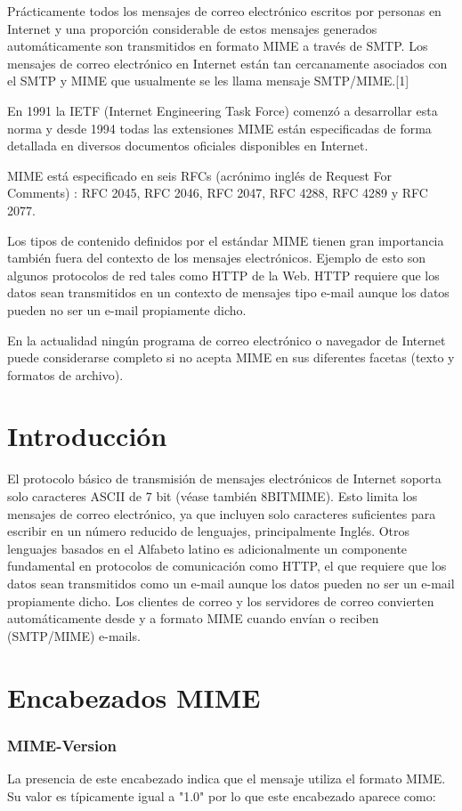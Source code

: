 \documentclass[a4paper]{report}
\begin{document}
Prácticamente todos los mensajes de correo electrónico escritos por personas en
Internet y una proporción considerable de estos mensajes generados
automáticamente son transmitidos en formato MIME a través de SMTP. Los mensajes
de correo electrónico en Internet están tan cercanamente asociados con el SMTP y
MIME que usualmente se les llama mensaje SMTP/MIME.[1]

En 1991 la IETF (Internet Engineering Task Force) comenzó a desarrollar esta
norma y desde 1994 todas las extensiones MIME están especificadas de forma
detallada en diversos documentos oficiales disponibles en Internet.

MIME está especificado en seis RFCs (acrónimo inglés de Request For Comments) :
RFC 2045, RFC 2046, RFC 2047, RFC 4288, RFC 4289 y RFC 2077.

Los tipos de contenido definidos por el estándar MIME tienen gran importancia
también fuera del contexto de los mensajes electrónicos. Ejemplo de esto son
algunos protocolos de red tales como HTTP de la Web. HTTP requiere que los datos
sean transmitidos en un contexto de mensajes tipo e-mail aunque los datos pueden
no ser un e-mail propiamente dicho.

En la actualidad ningún programa de correo electrónico o navegador de Internet
puede considerarse completo si no acepta MIME en sus diferentes facetas (texto y
formatos de archivo).

\section{Introducción}
El protocolo básico de transmisión de mensajes electrónicos de Internet soporta
solo caracteres ASCII de 7 bit (véase también 8BITMIME). Esto limita los
mensajes de correo electrónico, ya que incluyen solo caracteres suficientes para
escribir en un número reducido de lenguajes, principalmente Inglés. Otros
lenguajes basados en el Alfabeto latino es adicionalmente un componente
fundamental en protocolos de comunicación como HTTP, el que requiere que los
datos sean transmitidos como un e-mail aunque los datos pueden no ser un e-mail
propiamente dicho. Los clientes de correo y los servidores de correo convierten
automáticamente desde y a formato MIME cuando envían o reciben (SMTP/MIME)
e-mails.

\section*{Encabezados MIME}
\subsubsection*{MIME-Version}
La presencia de este encabezado indica que el mensaje utiliza el formato MIME. Su valor es típicamente igual a "1.0" por lo que este encabezado aparece como:
\end{document}

